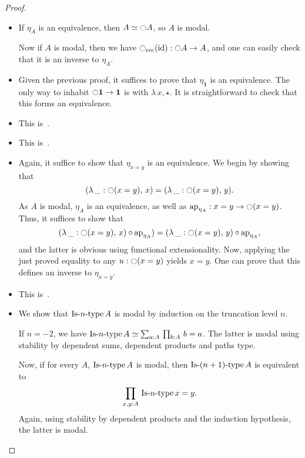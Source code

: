 \documentclass[notfinal]{jfrarticle}
\DeclareMathOperator{\id}{id}
\def\mymathhyphen{{\hbox{-}}}
\newcommand{\IsType}[1]
{\mathop{\mathrm{Is\mymathhyphen}#1\mathrm{\mymathhyphen type}} }
\newcommand{\modal}{\ensuremath{\ocircle}}
\newcommand \one {\mathbf{1}}
\newcommand \unittt{\star}
\newcommand{\sumD}[3]{\sum_{#1:#2}\, #3}
\newcommand{\prodD}[3]{\prod_{#1:#2}\, #3}
\newcommand{\ap}[1]{\mathrm{ap}_{#1}}
\begin{document}
\begin{proof}
  \begin{itemize}
  \item If $\eta_A$ is an equivalence, then $A\simeq \modal A$, so $A$
    is modal. 

    Now if $A$ is modal, then we have $\modal_{\text{rec}}(\id) :
    \modal A \to A$, and one can easily check that it is an inverse to $\eta_A$.
  \item Given the previous proof, it suffices to prove that
    $\eta_\one$ is an equivalence. The only way to inhabit
    $\modal\one \to \one$ is with $\lambda\, x, \unittt$. It is
    straightforward to check that this forms an equivalence.
  \item This is~\cite[Theorem 7.7.2]{hottbook}.
  \item This is~\cite[Corollary 7.7.3]{hottbook}.
  \item Again, it suffice to show that $\eta_{x=y}$ is an
    equivalence. We begin by showing that 
    \[ (\lambda\, \_ : \modal(x=y),\, x) = (\lambda\, \_ :
    \modal(x=y),\, y).\]
    As $A$ is modal, $\eta_A$ is an equivalence, as well as
    $\ap{\eta_A} : x=y \to \modal(x=y)$. Thus, it suffices to show that
     \[ (\lambda\, \_ : \modal(x=y),\, x) \circ \ap{\eta_A}) = (\lambda\, \_ :
    \modal(x=y),\, y) \circ\ap{\eta_A},\]
    and the latter is obvious using functional extensionality. 
    Now, applying the just proved equality to any $u:\modal(x=y)$
    yields $x=y$. One can prove that this defines an inverse to $\eta_{x=y}$.
  \item This is~\cite[Theorem 7.7.7]{hottbook}.
  \item We show that $\IsType n A$ is modal by induction on the truncation level $n$. 
    
    If $n=-2$, we have $\IsType n A \simeq \sumD a A {\prodD b A {b =
        a}}$. The latter is modal using stability by dependent sums,
    dependent products and paths type.

    Now, if for every $A$, $\IsType n A$ is modal, then $\IsType
    {(n+1)} A$ is equivalent to \[\prodD {x,y} A {\IsType n {x=y}}.\]
    Again, using stability by dependent products and the induction
    hypothesis, the latter is modal.


\end{itemize}
\end{proof}
\end{document}
